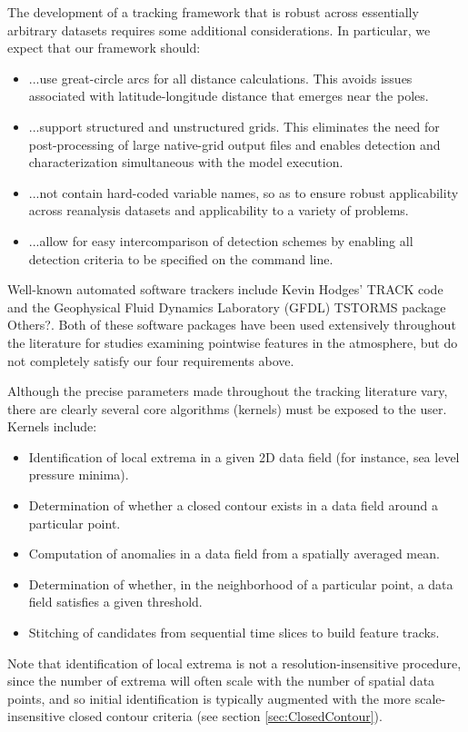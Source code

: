 \documentclass[gmdd, hvmath, online]{copernicus_discussions}
\begin{document}
The development of a tracking framework that is robust across essentially arbitrary datasets requires some additional considerations.  In particular, we expect that our framework should:
\begin{itemize}
\item[] ...use great-circle arcs for all distance calculations.  This avoids issues associated with latitude-longitude distance that emerges near the poles.
\item[] ...support structured and unstructured grids.  This eliminates the need for post-processing of large native-grid output files and enables detection and characterization simultaneous with the model execution.
\item[] ...not contain hard-coded variable names, so as to ensure robust applicability across reanalysis datasets and applicability to a variety of problems.
\item[] ...allow for easy intercomparison of detection schemes by enabling all detection criteria to be specified on the command line.
\end{itemize}  Well-known automated software trackers include Kevin Hodges' TRACK code \citep{hodges2015track} and the Geophysical Fluid Dynamics Laboratory (GFDL) TSTORMS package \citep{TSTORMS} {\color{red}Others?}.  Both of these software packages have been used extensively throughout the literature for studies examining pointwise features in the atmosphere, but do not completely satisfy our four requirements above.

Although the precise parameters made throughout the tracking literature vary, there are clearly several core algorithms (kernels) must be exposed to the user.  Kernels include:
\begin{itemize}
\item Identification of local extrema in a given 2D data field (for instance, sea level pressure minima).
\item Determination of whether a closed contour exists in a data field around a particular point.
\item Computation of anomalies in a data field from a spatially averaged mean.
\item Determination of whether, in the neighborhood of a particular point, a data field satisfies a given threshold.
\item Stitching of candidates from sequential time slices to build feature tracks.
\end{itemize}  Note that identification of local extrema is not a resolution-insensitive procedure, since the number of extrema will often scale with the number of spatial data points, and so initial identification is typically augmented with the more scale-insensitive closed contour criteria (see section \ref{sec:ClosedContour}).
\end{document}
